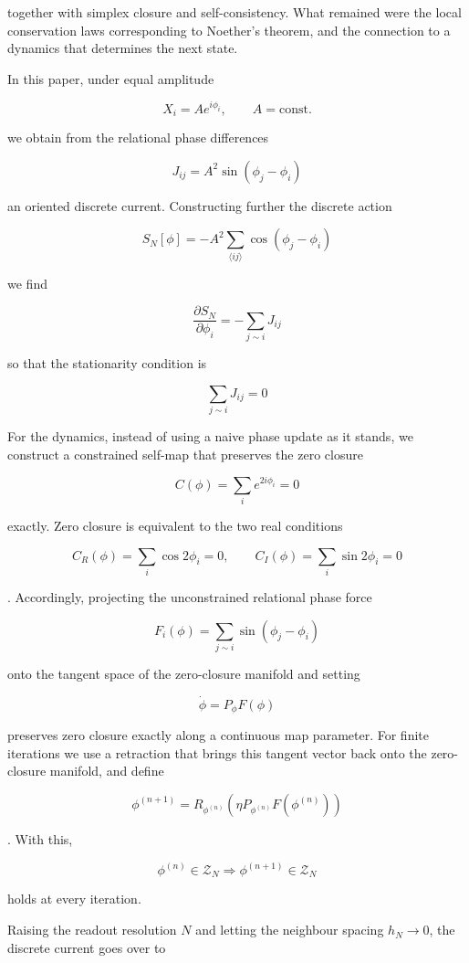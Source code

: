 \documentclass[
  a4paper,
]{article}
\begin{document}
together with simplex closure and self-consistency. What remained were
the local conservation laws corresponding to Noether's theorem, and the
connection to a dynamics that determines the next state.

In this paper, under equal amplitude

\[
X_i=Ae^{i\phi_i},
\qquad
A=\mathrm{const.}
\]

we obtain from the relational phase differences

\[
J_{ij}
=
A^2\sin(\phi_j-\phi_i)
\]

an oriented discrete current. Constructing further the discrete action

\[
S_N[\phi]
=
-A^2\sum_{\langle ij\rangle}
\cos(\phi_j-\phi_i)
\]

we find

\[
\frac{\partial S_N}{\partial\phi_i}
=
-\sum_{j\sim i}J_{ij}
\]

so that the stationarity condition is

\[
\sum_{j\sim i}J_{ij}=0
\]

For the dynamics, instead of using a naive phase update as it stands, we
construct a constrained self-map that preserves the zero closure

\[
C(\phi)
=
\sum_i e^{2i\phi_i}
=
0
\]

exactly. Zero closure is equivalent to the two real conditions

\[
C_R(\phi)=\sum_i\cos2\phi_i=0,
\qquad
C_I(\phi)=\sum_i\sin2\phi_i=0
\]

. Accordingly, projecting the unconstrained relational phase force

\[
F_i(\phi)
=
\sum_{j\sim i}\sin(\phi_j-\phi_i)
\]

onto the tangent space of the zero-closure manifold and setting

\[
\dot\phi
=
P_\phi F(\phi)
\]

preserves zero closure exactly along a continuous map parameter. For
finite iterations we use a retraction that brings this tangent vector
back onto the zero-closure manifold, and define

\[
\boxed{
\phi^{(n+1)}
=
R_{\phi^{(n)}}
\!\left(
\eta P_{\phi^{(n)}}F(\phi^{(n)})
\right)
}
\]

. With this,

\[
\phi^{(n)}\in\mathcal Z_N
\Longrightarrow
\phi^{(n+1)}\in\mathcal Z_N
\]

holds at every iteration.

Raising the readout resolution \(N\) and letting the neighbour spacing
\(h_N\to0\), the discrete current goes over to
\end{document}
